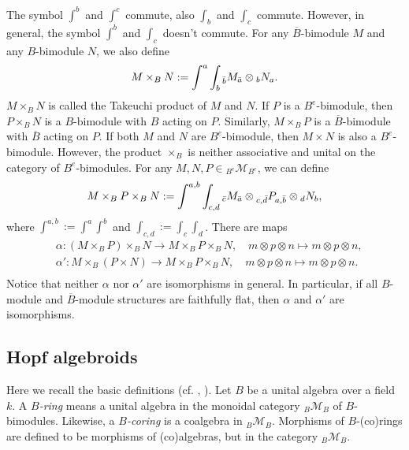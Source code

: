 \documentclass[a4paper,reqno]{amsart}
\numberwithin{equation}{section}
\theoremstyle{plain}
\theoremstyle{remark}
\numberwithin{equation}{section}
\newcommand{\ot}{\otimes}
\newcommand{\BB}{\overline{B}}
\newcommand{\M}{\mathcal{M}}
\newcommand{\CM}{\mathcal{M}}
\begin{document}
The symbol $\int^{b}$ and $\int^{c}$ commute, also $\int_{b}$ and $\int_{c}$ commute. However, in general, the symbol $\int^{b}$ and $\int_{c}$ doesn't commute. For any $\BB$-bimodule $M$ and any $B$-bimodule $N$, we also define
\begin{align*}
    M\times_{B}N:=\int^{a}\int_{b} {_{\Bar{b}}M_{\Bar{a}}}\ot {_bN_a}.
\end{align*}
$M\times_{B}N$ is called the Takeuchi product of $M$ and $N$. If $P$ is a $B^{e}$-bimodule, then $P\times_{B}N$ is a $B$-bimodule with $B$ acting on $P$. Similarly, $M\times_{B}P$ is a $\BB$-bimodule with $\BB$ acting on $P$. If both $M$ and $N$ are $B^{e}$-bimodule, then $M\times N$ is also a $B^{e}$-bimodule. However, the product $\times_{B}$ is neither associative and unital on the category of $B^{e}$-bimodules. For any $M,N, P\in {}_{B^{e}}\M_{B^{e}}$, we can define
\begin{align*}
    M\times_{B}P\times_{B}N:=\int^{a,b}\int_{c,d} {}_{\Bar{c}}M_{\Bar{a}}\ot {}_{c,\Bar{d}}P_{a, \Bar{b}}\ot {}_{d}N_{b},
\end{align*}
where $\int^{a,b}:=\int^{a}\int^{b}$ and $\int_{c,d}:=\int_{c}\int_{d}$. There are maps
\begin{align*}
    &\alpha:(M\times_{B}P)\times_{B} N\to M\times_{B}P\times_{B}N,\quad m\ot p\ot n\mapsto m\ot p\ot n,\\
    &\alpha':M\times_{B}(P\times N)\to M\times_{B}P\times_{B}N,\quad m\ot p\ot n\mapsto m\ot p\ot n.\\
\end{align*}
Notice that neither $\alpha$ nor $\alpha'$ are isomorphisms  in general. In particular, if all $B$-module and $\BB$-module structures are faithfully flat, then $\alpha$ and $\alpha'$ are isomorphisms. 













\subsection{Hopf algebroids}

Here we recall the basic definitions (cf. \cite{BW}, \cite{Boehm}). Let $B$ be a unital algebra over a field $k$.
A {\em $B$-ring}   means a unital algebra in the monoidal category ${}_B\CM_B$ of $B$-bimodules. Likewise,  a  {\em $B$-coring} is a coalgebra in ${}_B\CM_B$. Morphisms of $B$-(co)rings are defined to be morphisms of (co)algebras, but in the category ${}_B\CM_B$.
\end{document}
